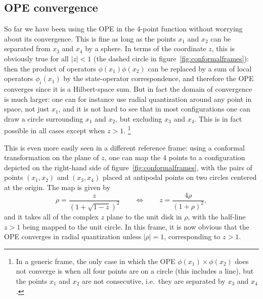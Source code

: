 \documentclass[a4paper,12pt]{article}
\numberwithin{equation}{section}
\begin{document}
\subsection{OPE convergence}

So far we have been using the OPE in the 4-point function without worrying about its convergence. This is fine as long as the points $x_1$ and $x_2$ can be separated from $x_3$ and $x_4$ by a sphere. 
In terms of the coordinate $z$, this is obviously true for all $\left| z \right| < 1$ (the dashed circle in figure~\ref{fig:conformalframes}): then the product of operators $\phi(x_1) \phi(x_2)$ can be replaced by a sum of local operators $\phi_i(x_1)$ by the state-operator correspondence, and therefore the OPE converges since it is a Hilbert-space sum. But in fact the domain of convergence is much larger: one can for instance use radial quantization around any point in space, not just $x_1$, and it is not hard to see that in most configurations one can draw a circle surrounding $x_1$ and $x_2$, but excluding $x_3$ and $x_4$. This is in fact possible in all cases except when $z > 1$.%
%
\footnote{In a generic frame, the only case in which the OPE $\phi(x_1) \times \phi(x_2)$ does not converge is when all four points are on a circle (this includes a line), but the points $x_1$ and $x_2$ are not consecutive, i.e.~they are separated by $x_3$ and $x_4$.}
%

This is even more easily seen in a different reference frame: using a conformal transformation on the plane of $z$, one can map the 4 points to a configuration depicted on the right-hand side of figure~\ref{fig:conformalframes}, with the pairs of points $(x_1, x_2) $ and  $(x_3, x_4)$ placed at antipodal points on two circles centered at the origin. The map is given by
\begin{equation}
	\rho = \frac{z}{\left( 1 + \sqrt{1-z} \right)^2}
	\qquad\Leftrightarrow\qquad
	z = \frac{4\rho}{(1 + \rho)^2},
\end{equation}
and it takes all of the complex $z$ plane to the unit disk in $\rho$, with the half-line $z > 1$ being mapped to the unit circle. In this frame, it is now obvious that the OPE converges in radial quantization unless $\left| \rho \right| = 1$, corresponding to $z > 1$.
\end{document}
